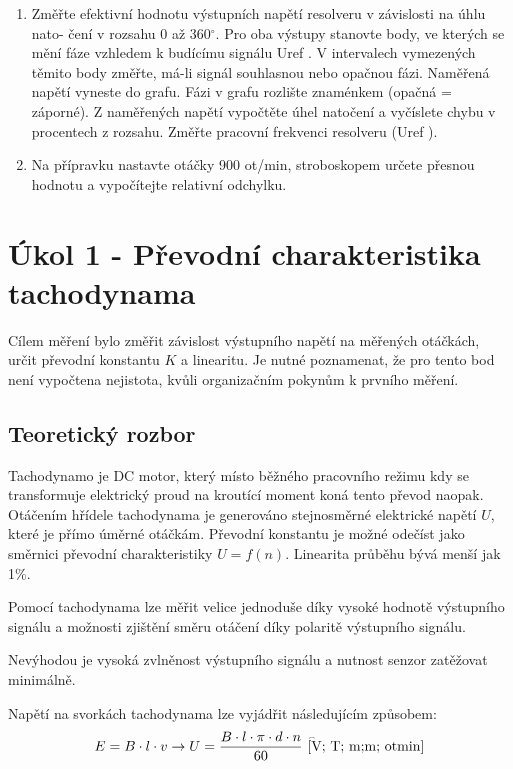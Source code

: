 \documentclass{protokol}
\begin{document}
\begin{enumerate}
        \item   Změřte efektivní hodnotu výstupních napětí resolveru v závislosti na úhlu nato-
                čení v rozsahu 0 až 360$^\circ$. Pro oba výstupy stanovte body, ve kterých se mění fáze
                vzhledem k budícímu signálu Uref . V intervalech vymezených těmito body změřte,
                má-li signál souhlasnou nebo opačnou fázi. Naměřená napětí vyneste do grafu. Fázi
                v grafu rozlište znaménkem (opačná = záporné). Z naměřených napětí vypočtěte
                úhel natočení a vyčíslete chybu v procentech z rozsahu. Změřte pracovní frekvenci
                resolveru (Uref ).

        \item   Na přípravku nastavte otáčky 900 ot/min, stroboskopem určete přesnou hodnotu a
                vypočítejte relativní odchylku.
    \end{enumerate}

\section{Úkol 1 - Převodní charakteristika tachodynama}
    Cílem měření bylo změřit závislost výstupního napětí na měřených otáčkách, určit převodní konstantu $K$ a linearitu. Je nutné poznamenat, 
    že pro tento bod není vypočtena nejistota, kvůli organizačním pokynům k prvního měření. 
    \subsection{Teoretický rozbor}
    Tachodynamo je DC motor, který místo běžného pracovního režimu kdy se transformuje elektrický proud na kroutící moment koná tento převod naopak.
    Otáčením hřídele tachodynama je generováno stejnosměrné elektrické napětí $U$, které je přímo úměrné otáčkám. Převodní konstantu je možné
    odečíst jako směrnici převodní charakteristiky $U = f(n)$. Linearita průběhu bývá menší jak 1$\%$\cite{navod}.

    Pomocí tachodynama lze měřit velice jednoduše díky vysoké hodnotě výstupního signálu a možnosti zjištění směru otáčení díky polaritě výstupního signálu. 
    
    Nevýhodou je vysoká zvlněnost výstupního signálu a nutnost senzor zatěžovat minimálně. 

    Napětí na svorkách tachodynama lze vyjádřit následujícím způsobem:
    \begin{equation}
        E = B \cdot l \cdot v \rightarrow U = \dfrac{B \cdot l \cdot \pi \cdot d \cdot n}{60} \text{ \t [V; T; m;m; otmin]}
    \end{equation}  
    
\end{document}
